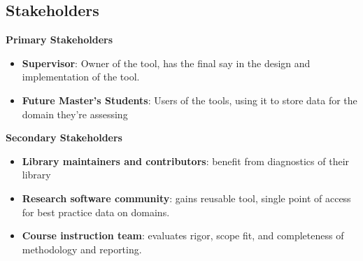 \documentclass{article}
\begin{document}
\subsection{Stakeholders}
\textbf{Primary Stakeholders}
\begin{itemize}
  \item \textbf{Supervisor}: Owner of the tool, has the final say in the design and implementation of the tool.
  \item \textbf{Future Master's Students}: Users of the tools, using it to store data for the domain they're assessing
\end{itemize}
\textbf{Secondary Stakeholders}
\begin{itemize}
  \item \textbf{Library maintainers and contributors}: benefit from diagnostics of their library
  \item \textbf{Research software community}: gains reusable tool, single point of access for best practice data on domains.
  \item \textbf{Course instruction team}: evaluates rigor, scope fit, and completeness
  of methodology and reporting.
\end{itemize}
\end{document}

